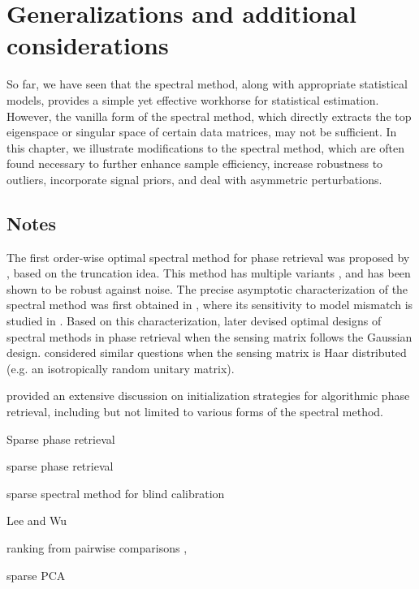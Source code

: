 \chapter{Generalizations and additional considerations}
\label{cha:generalized-spectral}

So far, we have seen that the spectral method, along with appropriate statistical models, provides a simple yet effective workhorse for statistical estimation. However, the vanilla form of the spectral method, which directly extracts the top eigenspace or singular space of certain data matrices, may not be sufficient. In this chapter, we illustrate modifications to the spectral method, which are often found necessary to further enhance sample efficiency, increase robustness to outliers, incorporate signal priors, and deal with asymmetric perturbations.

%

%

%



\section{Notes}

The first order-wise optimal spectral method  for phase retrieval was proposed by  \citet{chen2015solving}, based on the truncation idea. This method has multiple variants \citep{li2017nonconvex, wang2017solving}, and has been shown to be robust against noise. The precise asymptotic characterization of the spectral method was first obtained in \citet{lu2020phase}, where its sensitivity to model mismatch is studied in \citet{monardo2019sensitivity}. Based on this characterization, \citep{mondelli2017fundamental,luo2019optimal} later devised optimal designs of spectral methods in phase retrieval when the sensing matrix follows the Gaussian design. \cite{ma2019spectral,dudeja2020analysis} considered similar questions when the sensing matrix
is Haar distributed (e.g. an isotropically random unitary matrix).

\citep{fannjiang2020numerics} provided an extensive discussion on initialization strategies for algorithmic phase retrieval, including but not limited to various forms of the spectral method.

Sparse phase retrieval \citep{jagatap2019sample} 

sparse phase retrieval \citep{ma2019spectral}
 
\cite{yuan2013truncated}

sparse spectral method for blind calibration \cite{li2018blind}

Lee and Wu \cite{lee2017near}


 ranking from pairwise comparisons \citep{negahban2016rank,chen2015spectral,chen2017spectral}, 

sparse PCA \cite{amini2008high,JohLu09}